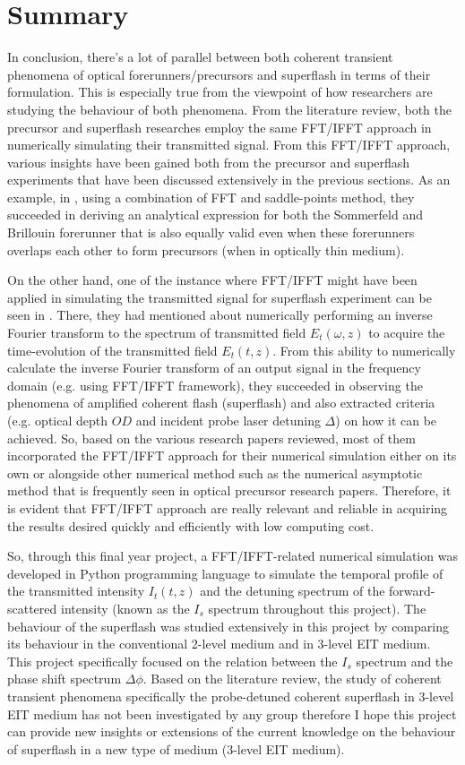 \chapter{Summary}
In conclusion, there's a lot of parallel between both coherent transient phenomena of optical forerunners/precursors and superflash in terms of their formulation. This is especially true from the viewpoint of how researchers are studying the behaviour of both phenomena. From the literature review, both the precursor and superflash researches employ the same FFT/IFFT approach in numerically simulating their transmitted signal. From this FFT/IFFT approach, various insights have been gained both from the precursor and superflash experiments that have been discussed extensively in the previous sections. As an example, in , using a combination of FFT and saddle-points method, they succeeded in deriving an analytical expression for both the Sommerfeld and Brillouin forerunner that is also equally valid even when these forerunners overlaps each other to form precursors (when in optically thin medium).

On the other hand, one of the instance where FFT/IFFT might have been applied in simulating the transmitted signal for superflash experiment can be seen in . There, they had mentioned about numerically performing an inverse Fourier transform to the spectrum of transmitted field $E_{t}(\omega, z)$ to acquire the time-evolution of the transmitted field $E_{t}(t, z)$. From this ability to numerically calculate the inverse Fourier transform of an output signal in the frequency domain (e.g. using FFT/IFFT framework), they succeeded in observing the phenomena of amplified coherent flash (superflash) and also extracted criteria (e.g. optical depth $OD$ and incident probe laser detuning $\Delta$) on how it can be achieved. So, based on the various research papers reviewed, most of them incorporated the FFT/IFFT approach for their numerical simulation either on its own or alongside other numerical method such as the numerical asymptotic method that is frequently seen in optical precursor research papers. Therefore, it is evident that FFT/IFFT approach are really relevant and reliable in acquiring the results desired quickly and efficiently with low computing cost.

So, through this final year project, a FFT/IFFT-related numerical simulation was developed in Python programming language to simulate the temporal profile of the transmitted intensity $I_{t}(t, z)$ and the detuning spectrum of the forward-scattered intensity (known as the $I_{s}$ spectrum throughout this project). The behaviour of the superflash was studied extensively in this project by comparing its behaviour in the conventional 2-level medium and in 3-level EIT medium. This project specifically focused on the relation between the $I_{s}$ spectrum and the phase shift spectrum $\Delta\phi$. Based on the literature review, the study of coherent transient phenomena specifically the probe-detuned coherent superflash in 3-level EIT medium has not been investigated by any group therefore I hope this project can provide new insights or extensions of the current knowledge on the behaviour of superflash in a new type of medium (3-level EIT medium).
